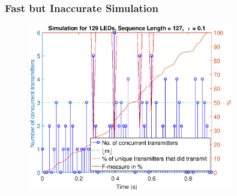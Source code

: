 \documentclass{beamer}
\begin{document}






	\begin{frame}\frametitle{Fast but Inaccurate Simulation}
		
		\begin{figure}
			\centering
			\includegraphics[width=0.8\textwidth]{../chapters/evaluation-chapters/simulation/sim-concurrent-tx-and-f-measure-eps=1-n=7}
		\end{figure}

	\end{frame}
\end{document}
